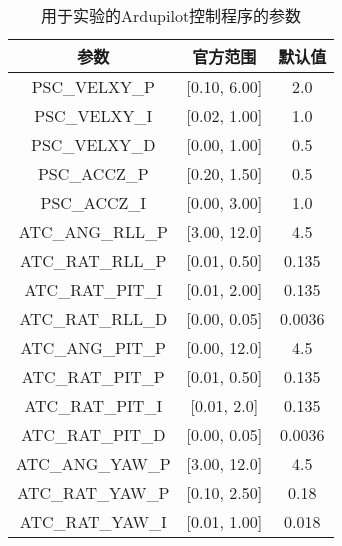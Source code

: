 
\begin{table*}[htb]
\centering
\begin{minipage}{0.49\linewidth}
\small
\caption{用于实验的Ardupilot控制程序的参数}
\label{tab:range_paramall}
\centering
\begin{tabular}{ccc}
        \toprule[1.5pt]
         参数 & 官方范围 & 默认值 \\
        \midrule[0.8pt]
         PSC\_VELXY\_P & [0.10, 6.00] & 2.0 \\ 
       
         PSC\_VELXY\_I & [0.02, 1.00] & 1.0 \\
       
         PSC\_VELXY\_D & [0.00, 1.00] & 0.5 \\
       
         PSC\_ACCZ\_P & [0.20, 1.50] & 0.5 \\
       
         PSC\_ACCZ\_I & [0.00, 3.00] & 1.0 \\
       
         ATC\_ANG\_RLL\_P & [3.00, 12.0] & 4.5 \\
       
         ATC\_RAT\_RLL\_P &  [0.01, 0.50] & 0.135 \\
        
         ATC\_RAT\_PIT\_I & [0.01, 2.00] & 0.135 \\
        
         ATC\_RAT\_RLL\_D & [0.00, 0.05] & 0.0036 \\
        
         ATC\_ANG\_PIT\_P & [0.00, 12.0] & 4.5 \\
       
         ATC\_RAT\_PIT\_P & [0.01, 0.50] & 0.135 \\
        
         ATC\_RAT\_PIT\_I & [0.01, 2.0] & 0.135 \\
        
         ATC\_RAT\_PIT\_D & [0.00, 0.05] & 0.0036 \\
       
         ATC\_ANG\_YAW\_P & [3.00, 12.0] &4.5 \\
       
         ATC\_RAT\_YAW\_P & [0.10, 2.50] & 0.18 \\
       
         ATC\_RAT\_YAW\_I & [0.01, 1.00]& 0.018 \\
       

\end{tabular}
\end{minipage}
\end{table*}
